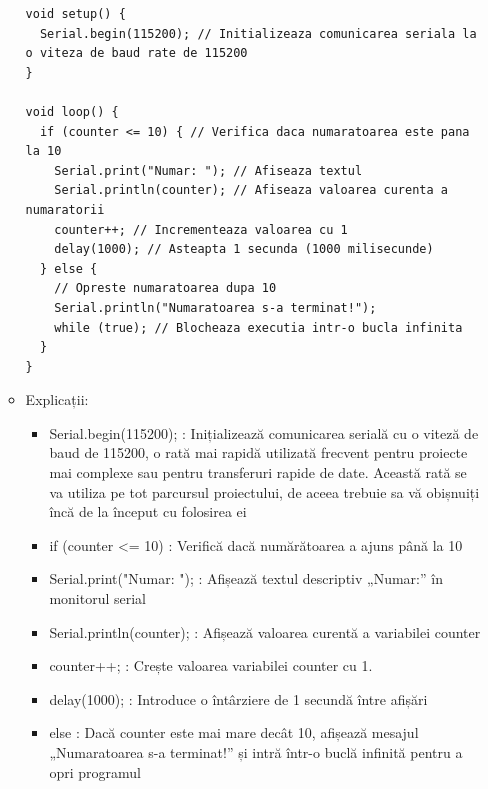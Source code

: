 \documentclass{report}
\begin{document}
\begin{itemize}
\begin{itemize}
\begin{lstlisting}
void setup() {
  Serial.begin(115200); // Initializeaza comunicarea seriala la o viteza de baud rate de 115200
}

void loop() {
  if (counter <= 10) { // Verifica daca numaratoarea este pana la 10
    Serial.print("Numar: "); // Afiseaza textul
    Serial.println(counter); // Afiseaza valoarea curenta a numaratorii
    counter++; // Incrementeaza valoarea cu 1
    delay(1000); // Asteapta 1 secunda (1000 milisecunde)
  } else {
    // Opreste numaratoarea dupa 10
    Serial.println("Numaratoarea s-a terminat!");
    while (true); // Blocheaza executia intr-o bucla infinita
  }
}

                \end{lstlisting}
               
                    \item Explicații:
                        \begin{itemize}
                            \item Serial.begin(115200); : Inițializează comunicarea serială cu o viteză de baud de 115200, o rată mai rapidă utilizată frecvent pentru proiecte mai complexe sau pentru transferuri rapide de date. Această rată se va utiliza pe tot parcursul proiectului, de aceea trebuie sa vă obișnuiți încă de la început cu folosirea ei
                            \item if (counter <= 10) : Verifică dacă numărătoarea a ajuns până la 10
                            \item Serial.print("Numar: "); : Afișează textul descriptiv „Numar:” în monitorul serial
                            \item Serial.println(counter); : Afișează valoarea curentă a variabilei counter
                            \item counter++; : Crește valoarea variabilei counter cu 1.
                            \item delay(1000); : Introduce o întârziere de 1 secundă între afișări
                            \item else : Dacă counter este mai mare decât 10, afișează mesajul „Numaratoarea s-a terminat!” și intră într-o buclă infinită pentru a opri programul
                            
                        \end{itemize}
             
        \end{itemize}

\end{itemize}
\end{document}
